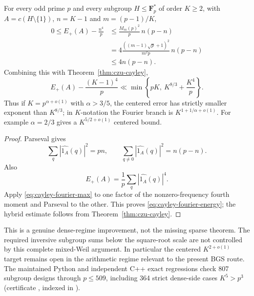 \begin{theorem}
For every odd prime $p$ and every subgroup $H\le\mathbf F_p^*$ of order
$K\ge2$, with $A=c(H\setminus\{1\})$, $n=K-1$ and
$m=(p-1)/K$,
\begin{align}
0\le E_+(A)-\frac{n^4}{p}
&\le \frac{M_m(p)^2}{p}\,n(p-n) \\
&=4\frac{((m-1)\sqrt p+1)^2}{m^2p}\,n(p-n) \\
&\le4n(p-n).                                      \label{eq:cayley-fourier-energy}
\end{align}
Combining this with Theorem~\ref{thm:czu-cayley},
\[
 E_+(A)-\frac{(K-1)^4}{p}
 \ll \min\!\left\{pK,\ K^{8/3}+\frac{K^4}{p}\right\}.
\]
Thus if $K=p^{\alpha+o(1)}$ with $\alpha>3/5$, the centered error has
strictly smaller exponent than $K^{8/3}$; in $K$-notation the Fourier
branch is $K^{1+1/\alpha+o(1)}$.  For example $\alpha=2/3$ gives a
$K^{5/2+o(1)}$ centered bound.
\end{theorem}
\begin{proof}
Parseval gives
\[
 \sum_q|\widehat{1_A}(q)|^2=pn,\qquad
 \sum_{q\ne0}|\widehat{1_A}(q)|^2=n(p-n).
\]
Also
\[
 E_+(A)=\frac1p\sum_q|\widehat{1_A}(q)|^4.
\]
Apply \eqref{eq:cayley-fourier-max} to one factor of the nonzero-frequency
fourth moment and Parseval to the other.  This proves
\eqref{eq:cayley-fourier-energy}; the hybrid estimate follows from
Theorem~\ref{thm:czu-cayley}.
\end{proof}

\begin{remark}
This is a genuine dense-regime improvement, not the missing sparse theorem.
The required inversive subgroup sums below the square-root scale are not
controlled by this complete mixed-Weil argument.  In particular the centered
$K^{2+o(1)}$ target remains open in the arithmetic regime relevant to the
present BGS route.  The maintained Python and independent C++ exact
regressions check 807 subgroup designs through $p\le509$, including 364
strict dense-side cases $K^5>p^3$ (certificate
, indexed in
).
\end{remark}
